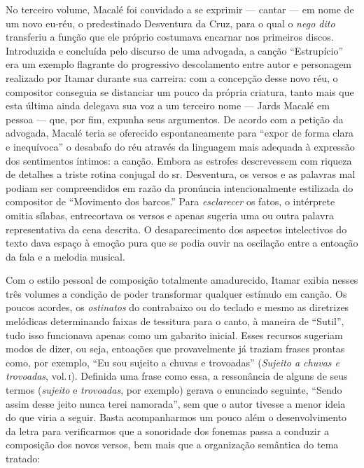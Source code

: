 No terceiro volume, Macalé foi convidado a se exprimir --- cantar --- em nome
de um novo eu-réu, o predestinado Desventura da Cruz, para o qual o \textit{nego
dito} transferiu a função que ele próprio costumava encarnar nos
primeiros discos. Introduzida e concluída pelo discurso de uma advogada,
a canção ``Estrupício'' era um exemplo flagrante do progressivo descolamento
entre autor e personagem realizado por Itamar durante sua carreira: com
a concepção desse novo réu, o compositor conseguia se distanciar um
pouco da própria criatura, tanto mais que esta última ainda delegava sua
voz a um terceiro nome --- Jards Macalé em pessoa --- que, por fim, expunha
seus argumentos. De acordo com a petição da advogada, Macalé teria se
oferecido espontaneamente para ``expor de forma clara e inequívoca'' o
desabafo do réu através da linguagem mais adequada à expressão dos
sentimentos íntimos: a canção. Embora as estrofes descrevessem com
riqueza de detalhes a triste rotina conjugal do sr. Desventura, os
versos e as palavras mal podiam ser compreendidos em razão da pronúncia
intencionalmente estilizada do compositor de ``Movimento dos barcos.'' Para
\textit{esclarecer} os fatos, o intérprete omitia sílabas, entrecortava os
versos e apenas sugeria uma ou outra palavra representativa da cena
descrita. O desaparecimento dos aspectos intelectivos do texto dava
espaço à emoção pura que se podia ouvir na oscilação entre a entoação da
fala e a melodia musical.

Com o estilo pessoal de composição totalmente amadurecido, Itamar exibia
nesses três volumes a condição de poder transformar qualquer estímulo em
canção. Os poucos acordes, os \textit{ostinatos} do contrabaixo ou do teclado e
mesmo as diretrizes melódicas determinando faixas de tessitura para o
canto, à maneira de ``Sutil'', tudo isso funcionava apenas como um
gabarito inicial. Esses recursos sugeriam modos de dizer, ou seja,
entoações que provavelmente já traziam frases prontas como, por exemplo,
``Eu sou sujeito a chuvas e trovoadas'' (\textit{Sujeito a chuvas e trovoadas},
vol.\,\textsc{i}). Definida uma frase como essa, a ressonância de alguns de seus
termos (\textit{sujeito} e \textit{trovoadas}, por exemplo) gerava o enunciado
seguinte, ``Sendo assim desse jeito nunca terei namorada'', sem que o
autor tivesse a menor ideia do que viria a seguir. Basta acompanharmos
um pouco além o desenvolvimento da letra para verificarmos que a
sonoridade dos fonemas passa a conduzir a composição dos novos versos,
bem mais que a organização semântica do tema tratado:

